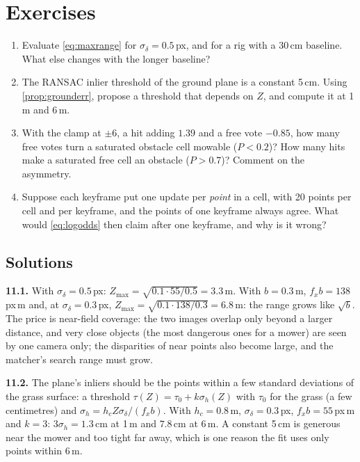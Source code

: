 \FloatBarrier
\section*{Exercises}

\begin{enumerate}[label=\textbf{11.\arabic*},ref=11.\arabic*]
\item\label{ex:11range} Evaluate \eqref{eq:maxrange} for
  $\sigma_\delta=0.5$\,px, and for a rig with a 30\,cm baseline. What
  else changes with the longer baseline?
\item\label{ex:11thr} The RANSAC inlier threshold of the ground plane is
  a constant 5\,cm. Using \cref{prop:grounderr}, propose a threshold that
  depends on $Z$, and compute it at 1\,m and 6\,m.
\item\label{ex:11chair} With the clamp at $\pm6$, a hit adding $1.39$
  and a free vote $-0.85$, how many free votes turn a saturated
  obstacle cell mowable ($P<0.2$)? How many hits make a saturated free
  cell an obstacle ($P>0.7$)? Comment on the asymmetry.
\item\label{ex:11pervote} Suppose each keyframe put one update per
  \emph{point} in a cell, with 20 points per cell and per keyframe, and
  the points of one keyframe always agree. What would \eqref{eq:logodds}
  then claim after one keyframe, and why is it wrong?
\end{enumerate}

\subsection*{Solutions}

\textbf{11.1.} With $\sigma_\delta=0.5$\,px: $Z_{\max}=\sqrt{0.1\cdot
55/0.5}=3.3$\,m. With $b=0.3$\,m, $f_xb=138$\,px\,m and, at
$\sigma_\delta=0.3$\,px, $Z_{\max}=\sqrt{0.1\cdot138/0.3}=6.8$\,m: the
range grows like $\sqrt b$. The price is near-field coverage: the two
images overlap only beyond a larger distance, and very close objects
(the most dangerous ones for a mower) are seen by one camera only; the
disparities of near points also become large, and the matcher's
search range must grow.

\textbf{11.2.} The plane's inliers should be the points within a few
standard deviations of the grass surface: a threshold $\tau(Z)=
\tau_0+k\sigma_h(Z)$ with $\tau_0$ for the grass (a few centimetres)
and $\sigma_h=h_cZ\sigma_\delta/(f_xb)$. With $h_c=0.8$\,m,
$\sigma_\delta=0.3$\,px, $f_xb=55$\,px\,m and $k=3$: $3\sigma_h=1.3$\,cm
at 1\,m and $7.8$\,cm at 6\,m. A constant 5\,cm is generous near the
mower and too tight far away, which is one reason the fit uses only
points within 6\,m.

